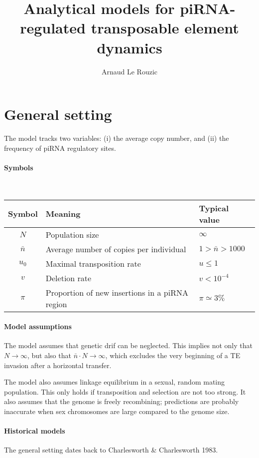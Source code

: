 \documentclass[10pt,a4paper]{article}
\title{Analytical models for piRNA-regulated transposable element dynamics}
\author{Arnaud Le Rouzic}
\begin{document}
\maketitle

\section{General setting}

The model tracks two variables: (i) the average copy number, and (ii) the frequency of piRNA regulatory sites.

\paragraph{Symbols} \mbox{} \\

\begin{tabular}{cll}
Symbol & Meaning & Typical value \\ \hline
$N$ & Population size & $\infty$ \\
$\bar n$ & Average number of copies per individual & $1 > \bar n > 1000$ \\
$u_0$ & Maximal transposition rate & $u \leq 1$ \\
$v$ & Deletion rate & $v < 10^{-4}$ \\
$\pi$ & Proportion of new insertions in a piRNA region & $\pi \simeq 3\%$ \\
\end{tabular}

\paragraph {Model assumptions} The model assumes that genetic drif can be neglected. This implies not only that $N \rightarrow \infty$, but also that $\bar n \cdot N \rightarrow \infty$, which excludes the very beginning of a TE invasion after a horizontal transfer. 

The model also assumes linkage equilibrium in a sexual, random mating population. This only holds if transposition and selection are not too strong. It also assumes that the genome is freely recombining; predictions are probably inaccurate when sex chromosomes are large compared to the genome size. 

\paragraph {Historical models} The general setting dates back to Charlesworth \& Charlesworth 1983. 
\end{document}
